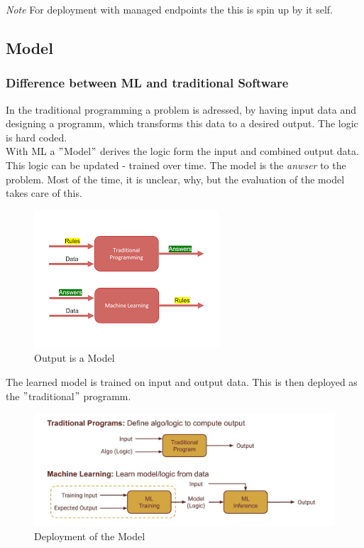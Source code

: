 \textit{Note} For deployment with managed endpoints the this is spin up by it self.

\subsection{Model}
\subsubsection{Difference between ML and traditional Software}
In the traditional programming a problem is adressed, by having input data and designing a programm, which transforms this data to a desired output. The logic is hard coded.\\ 

With \gls{ML} a $"$Model$"$ derives the logic form the input and combined output data. This logic can be updated - trained over time. The model is the \textit{anwser} to the problem. Most of the time, it is unclear, why, but the evaluation of the model takes care of this.

\begin{figure}[H]
	\centering
	\includegraphics[scale = 0.1]{attachment/chapter_10/Scc034.PNG}
	\caption{Output is a Model}
\end{figure}

The learned model is trained on input and output data. This is then deployed as the $"$traditional$"$ programm.

\begin{figure}[H]
	\centering
	\includegraphics[scale = 0.1]{attachment/chapter_10/Scc035.JPG}
	\caption{Deployment of the Model}
\end{figure}

